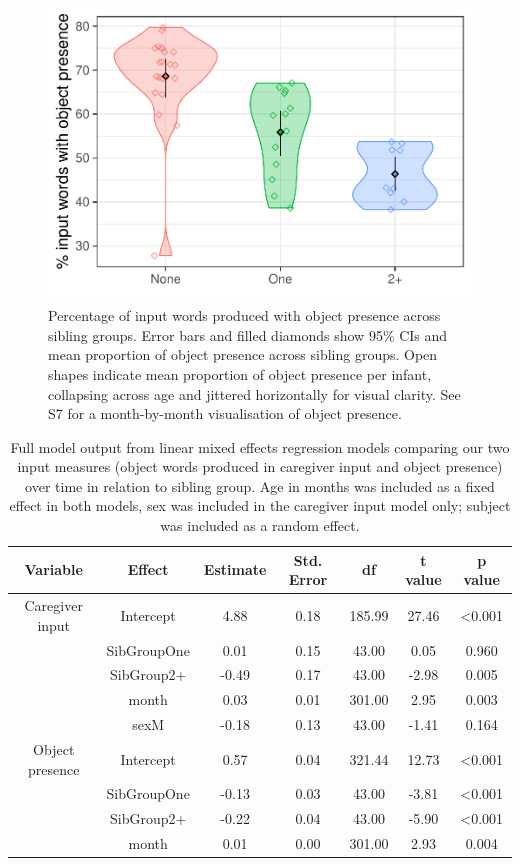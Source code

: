 \documentclass[
  man,mask,floatsintext]{apa6}
\begin{document}
\begin{figure}
\centering
\includegraphics{SiblingsStudyText-anon-revisions_files/figure-latex/Figure-object-presence-1.pdf}
\caption{\label{fig:Figure-object-presence}Percentage of input words produced with object presence across sibling groups. Error bars and filled diamonds show 95\% CIs and mean proportion of object presence across sibling groups. Open shapes indicate mean proportion of object presence per infant, collapsing across age and jittered horizontally for visual clarity. See S7 for a month-by-month visualisation of object presence.}
\end{figure}

\begin{longtable}[t]{ccccccc}
\caption{\label{tab:table-input-model-summary}Full model output from linear mixed effects regression models comparing our two input measures (object words produced in caregiver input and object presence) over time in relation to sibling group. Age in months was included as a fixed effect in both models, sex was included in the caregiver input model only; subject was included as a random effect.}\\
\toprule
Variable & Effect & Estimate & Std. Error & df & t value & p value\\
\midrule
Caregiver input & Intercept & 4.88 & 0.18 & 185.99 & 27.46 & <0.001\\
 & SibGroupOne & 0.01 & 0.15 & 43.00 & 0.05 & 0.960\\
 & SibGroup2+ & -0.49 & 0.17 & 43.00 & -2.98 & 0.005\\
 & month & 0.03 & 0.01 & 301.00 & 2.95 & 0.003\\
 & sexM & -0.18 & 0.13 & 43.00 & -1.41 & 0.164\\
\midrule
\addlinespace
Object presence & Intercept & 0.57 & 0.04 & 321.44 & 12.73 & <0.001\\
 & SibGroupOne & -0.13 & 0.03 & 43.00 & -3.81 & <0.001\\
 & SibGroup2+ & -0.22 & 0.04 & 43.00 & -5.90 & <0.001\\
 & month & 0.01 & 0.00 & 301.00 & 2.93 & 0.004\\
\bottomrule
\end{longtable}
\end{document}
